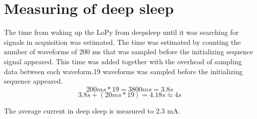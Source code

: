 \section{Measuring of deep sleep}
The time from waking up the LoPy from deepsleep until it was searching for signals in acquisition was estimated. The time was estimated by counting the number of waveforms of 200 ms that was sampled before the initializing sequence signal appeared. This time was added together with the overhead of sampling data between each waveform.19 waveforms was sampled before the initializing sequence appeared. 
\begin{equation}
200ms * 19 = 3800 ms = 3.8 s
\end{equation}
\begin{equation}
3.8 s + (20ms*19) = 4.18 s \approx  4 s
\end{equation}

The average current in deep sleep is measured to 2.3 mA. 















